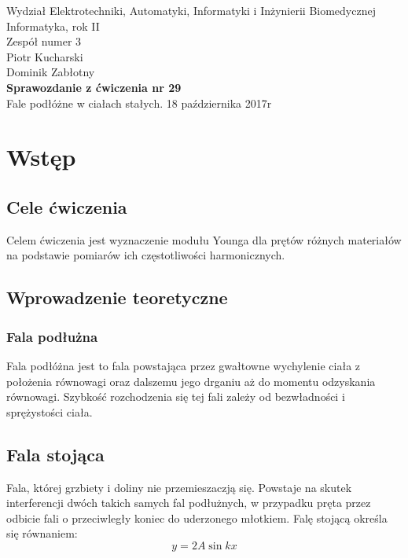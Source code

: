 \documentclass[a4paper,12pts]{article}
\begin{document}
	\thispagestyle{empty}
	\begin{flushleft}
		Wydział Elektrotechniki, Automatyki, Informatyki i Inżynierii Biomedycznej \\
		Informatyka, rok II \\
		Zespół numer 3 \\
		Piotr Kucharski \\
		Dominik Zabłotny \\
		\vspace*{\fill}
		{\large \textbf{Sprawozdanie z ćwiczenia nr 29} } \\
		Fale podłóżne w ciałach stałych.	
		\vfill	
		18 października 2017r
	\end{flushleft}
	
	\newpage
	

\section{Wstęp}

\subsection{Cele ćwiczenia}
Celem ćwiczenia jest wyznaczenie modułu Younga dla prętów różnych materiałów na podstawie pomiarów ich częstotliwości harmonicznych.

\subsection{Wprowadzenie teoretyczne}
\subsubsection{Fala podłużna}
Fala podłóżna jest to fala powstająca przez gwałtowne wychylenie ciała z położenia równowagi oraz dalszemu jego drganiu aż do momentu odzyskania równowagi. Szybkość rozchodzenia się tej fali zależy od bezwładności i sprężystości ciała.

\subsection{Fala stojąca}
Fala, której grzbiety i doliny nie przemieszaczją się. Powstaje na skutek interferencji dwóch takich samych fal podłużnych, w przypadku pręta przez odbicie fali o przeciwległy koniec do uderzonego młotkiem. Falę stojącą określa się równaniem:
\begin{equation}
y = 2A \sin kx
\end{equation}
\end{document}
